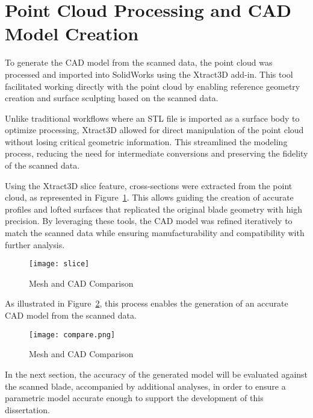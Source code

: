 \section{Point Cloud Processing and CAD Model Creation}
\label{sec:cad}

To generate the CAD model from the scanned data, the point cloud was processed and imported into SolidWorks using the Xtract3D add-in. This tool facilitated working directly with the point cloud by enabling reference geometry creation and surface sculpting based on the scanned data.

Unlike traditional workflows where an STL file is imported as a surface body to optimize processing, Xtract3D allowed for direct manipulation of the point cloud without losing critical geometric information. This streamlined the modeling process, reducing the need for intermediate conversions and preserving the fidelity of the scanned data.

Using the Xtract3D slice feature, cross-sections were extracted from the point cloud, as represented in Figure~\ref{fig:slice}. This allows guiding the creation of accurate profiles and lofted surfaces that replicated the original blade geometry with high precision. By leveraging these tools, the CAD model was refined iteratively to match the scanned data while ensuring manufacturability and compatibility with further analysis.

\begin{figure}[H]
    \centering
    \texttt{[image: slice]}
    \caption{Mesh and CAD Comparison}
    \label{fig:slice}
\end{figure}

As illustrated in Figure~\ref{fig:compare.png}, this process enables the generation of an accurate CAD model from the scanned data.

\begin{figure}[H]
    \centering
    \texttt{[image: compare.png]}
    \caption{Mesh and CAD Comparison}
    \label{fig:compare.png}
\end{figure}

In the next section, the accuracy of the generated model will be evaluated against the scanned blade, accompanied by additional analyses, in order to ensure a parametric model accurate enough to support the development of this dissertation.
